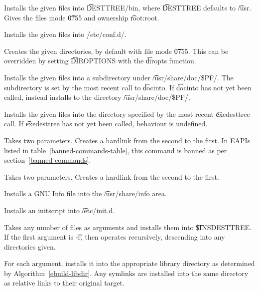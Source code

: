 \begin{description}
\item[dobin] Installs the given files into \t{DESTTREE/bin}, where \t{DESTTREE} defaults to
    \t{/usr}. Gives the files mode \t{0755} and ownership \t{root:root}.

\item[doconfd] Installs the given files into /etc/conf.d/.

\item[dodir] Creates the given directories, by default with file mode \t{0755}. This can be overridden
    by setting \t{DIROPTIONS} with the \t{diropts} function.

\item[dodoc] Installs the given files into a subdirectory under \t{/usr/share/doc/\$PF/}. The
    subdirectory is set by the most recent call to \t{docinto}. If \t{docinto} has not
    yet been called, instead installs to the directory \t{/usr/share/doc/\$PF/}.

\item[doexe] Installs the given files into the directory specified by the most recent
    \t{exedesttree} call. If \t{exedesttree} has not yet been called, behaviour is undefined.

\IFKDEBUILDELSE
{
    \item[dohard] Takes two parameters. Creates a hardlink from the second to the first. In EAPIs
    listed in table~\ref{banned-commands-table}, this command is banned as per
    section~\ref{banned-commands}.
}{
    \item[dohard] Takes two parameters. Creates a hardlink from the second to the first.
}

\IFKDEBUILDELSE
{
    \item[dohtml] 
}{
    \item[dohtml] 
}

\item[doinfo] Installs a GNU Info file into the \t{/usr/share/info} area.

\item[doinitd] Installs an initscript into \t{/etc/init.d}.

\item[doins] Takes any number of files as arguments and installs them into \t{\$INSDESTTREE}\@. If
    the first argument is \t{-r}, then operates recursively, descending into any directories given.

\item[dolib] For each argument, installs it into the appropriate library directory as determined by
    Algorithm~\ref{ebuild-libdir}. Any symlinks are installed into the same directory as relative
    links to their original target.


\end{description}
